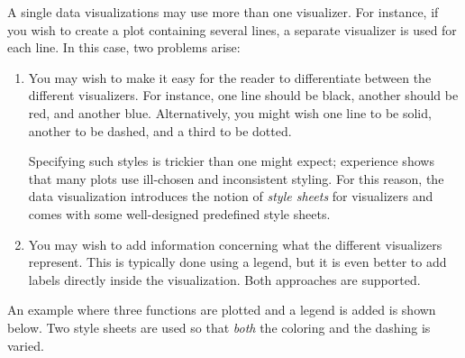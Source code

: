 A single data visualizations may use more than one visualizer. For instance, if
you wish to create a plot containing several lines, a separate visualizer is
used for each line. In this case, two problems arise:
%
\begin{enumerate}
    \item You may wish to make it easy for the reader to differentiate between
        the different visualizers. For instance, one line should be black,
        another should be red, and another blue. Alternatively, you might wish
        one line to be solid, another to be dashed, and a third to be dotted.

        Specifying such styles is trickier than one might expect; experience
        shows that many plots use ill-chosen and inconsistent styling. For this
        reason, the data visualization introduces the notion of \emph{style
        sheets} for visualizers and comes with some well-designed predefined
        style sheets.
    \item You may wish to add information concerning what the different
        visualizers represent. This is typically done using a legend, but it is
        even better to add labels directly inside the visualization. Both
        approaches are supported.
\end{enumerate}

An example where three functions are plotted and a legend is added is shown
below. Two style sheets are used so that \emph{both} the coloring and the
dashing is varied.
%
\begin{codeexample}[preamble={\usetikzlibrary{datavisualization.formats.functions}}]
\end{codeexample}

